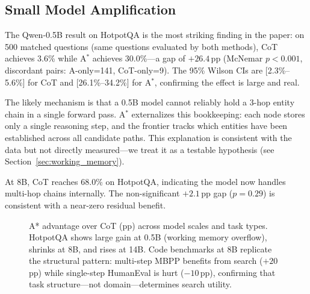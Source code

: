 \documentclass{article}
\newcommand{\astar}{A$^*$\xspace}
\begin{document}
\subsection{Small Model Amplification}
\label{sec:amplification}

The Qwen-0.5B result on HotpotQA is the most striking finding in the paper: on 500 matched questions (same questions evaluated by both methods), CoT achieves 3.6\% while \astar achieves 30.0\%---a gap of $+26.4$\,pp (McNemar $p<0.001$, discordant pairs: A\*-only=141, CoT-only=9). The 95\% Wilson CIs are [2.3\%--5.6\%] for CoT and [26.1\%--34.2\%] for \astar, confirming the effect is large and real.

The likely mechanism is that a 0.5B model cannot reliably hold a 3-hop entity chain in a single forward pass. \astar externalizes this bookkeeping: each node stores only a single reasoning step, and the frontier tracks which entities have been established across all candidate paths. This explanation is consistent with the data but not directly measured---we treat it as a testable hypothesis (see Section~\ref{sec:working_memory}).

At 8B, CoT reaches 68.0\% on HotpotQA, indicating the model now handles multi-hop chains internally. The non-significant $+2.1$\,pp gap ($p=0.29$) is consistent with a near-zero residual benefit.

\begin{figure}[h]
\centering
{}
\caption{A* advantage over CoT (pp) across model scales and task types. HotpotQA shows large gain at 0.5B (working memory overflow), shrinks at 8B, and rises at 14B. Code benchmarks at 8B replicate the structural pattern: multi-step MBPP benefits from search ($+20$\,pp) while single-step HumanEval is hurt ($-10$\,pp), confirming that task structure---not domain---determines search utility.}
\label{fig:scale_gap}
\end{figure}
\end{document}
